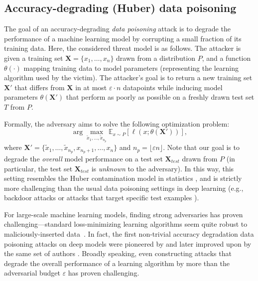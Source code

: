 \subsection{Accuracy-degrading (Huber) data poisoning}
\label{sec:poisoning}
The goal of an accuracy-degrading {\em data poisoning} attack is to degrade the
performance of a machine learning model by corrupting a small fraction of its
training data.
Here, the considered threat model is as follows. The attacker is given
a training set $\mathbf{X} = \{x_1, \ldots, x_n\}$
drawn from a distribution $P$,
and a function $\theta(\cdot)$ mapping training data to model
parameters (representing the learning algorithm used by the victim).
The attacker's goal is to return a new training set $\mathbf{X}'$ that differs
from $\mathbf{X}$ in at most $\varepsilon\cdot n$ datapoints while
inducing model
parameters $\theta(\mathbf{X}')$ that perform as poorly as possible on a freshly
drawn test set $T$ from $P$.

Formally, the adversary aims to solve the following optimization problem:
\begin{equation}
  \label{eq:poisoning}
  \arg\max_{\widetilde{x}_1, \ldots, \widetilde{x}_{n_p}}
  \mathbb{E}_{x \sim P}[\ell(x; \theta(\mathbf{X}'))],
\end{equation}
where $\mathbf{X}' = \{\widetilde{x}_1, \ldots, \widetilde{x}_{n_p},
x_{n_p+1}, \ldots, x_n\}$ and $n_p = \lfloor \varepsilon n \rfloor$.
Note that our goal is to degrade the {\em overall} model performance
on a test set $\mathbf{X}_{test}$ drawn from $P$ (in particular,
the test set $\mathbf{X}_{test}$ is {\em unknown} to the adversary).
In this way, this setting resembles
the Huber contamination model in statistics \citep{huber1964robust},
and is strictly more challenging than the usual data poisoning
settings in deep learning (e.g., backdoor attacks
  \citep{gu2017badnets} or attacks that target specific test examples
\citep{koh2017understanding}).

For large-scale machine learning models, finding strong adversaries has proven
challenging---standard loss-minimizing learning algorithms seem quite robust to
maliciously-inserted data~\citep{lu2023exploring}.
In fact, the first non-trivial accuracy degradation data poisoning attacks on
deep models were pioneered by \citet{lu2022indiscriminate} and later improved 
upon by the same set of authors \citep{lu2023exploring}.
Broadly speaking, even constructing attacks that degrade the overall performance of a
learning algorithm by more than the adversarial budget $\varepsilon$
has proven challenging.

